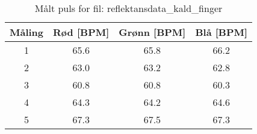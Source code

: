
\begin{table}[H]
\centering
\caption{Målt puls for fil: reflektansdata\_kald\_finger}
\label{tab:reflektansdata\_kald\_finger}
\begin{tabular}{|c|c|c|c|}
\hline
\textbf{Måling} & \textbf{Rød [BPM]} & \textbf{Grønn [BPM]} & \textbf{Blå [BPM]} \\ \hline
1 & 65.6 & 65.8 & 66.2 \\ \hline
2 & 63.0 & 63.2 & 62.8 \\ \hline
3 & 60.8 & 60.8 & 60.3 \\ \hline
4 & 64.3 & 64.2 & 64.6 \\ \hline
5 & 67.3 & 67.5 & 67.3 \\ \hline
\end{tabular}
\end{table}
